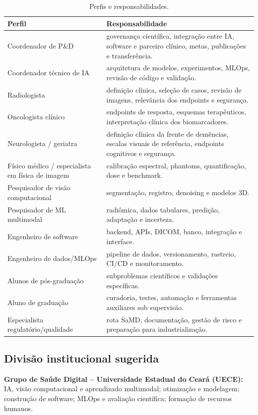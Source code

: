 \documentclass[11pt,a4paper]{article}
\begin{document}
\begin{table}[htbp]
\centering
\caption{Perfis e responsabilidades.}
\begin{tabular}{p{4.4cm}p{9.2cm}}
\toprule
\textbf{Perfil} & \textbf{Responsabilidade}\\
\midrule
Coordenador de P\&D & governança científica, integração entre IA, software e parceiro clínico, metas, publicações e transferência.\\
Coordenador técnico de IA & arquitetura de modelos, experimentos, MLOps, revisão de código e validação.\\
Radiologista & definição clínica, seleção de casos, revisão de imagens, relevância dos endpoints e segurança.\\
Oncologista clínico & endpoints de resposta, esquemas terapêuticos, interpretação clínica dos biomarcadores.\\
Neurologista / geriatra & definição clínica da frente de demências, escalas visuais de referência, endpoints cognitivos e segurança.\\
Físico médico / especialista em física de imagem & calibração espectral, phantoms, quantificação, dose e benchmark.\\
Pesquisador de visão computacional & segmentação, registro, denoising e modelos 3D.\\
Pesquisador de ML multimodal & radiômica, dados tabulares, predição, adaptação e incerteza.\\
Engenheiro de software & backend, APIs, DICOM, banco, integração e interface.\\
Engenheiro de dados/MLOps & pipeline de dados, versionamento, rastreio, CI/CD e monitoramento.\\
Alunos de pós-graduação & subproblemas científicos e validações específicas.\\
Aluno de graduação & curadoria, testes, automação e ferramentas auxiliares sob supervisão.\\
Especialista regulatório/qualidade & rota SaMD, documentação, gestão de risco e preparação para industrialização.\\
\bottomrule
\end{tabular}
\end{table}

\subsection{Divisão institucional sugerida}

\textbf{Grupo de Saúde Digital -- Universidade Estadual do Ceará (UECE):} IA, visão computacional e aprendizado multimodal; otimização e modelagem; construção de software; MLOps e avaliação científica; formação de recursos humanos.
\end{document}

